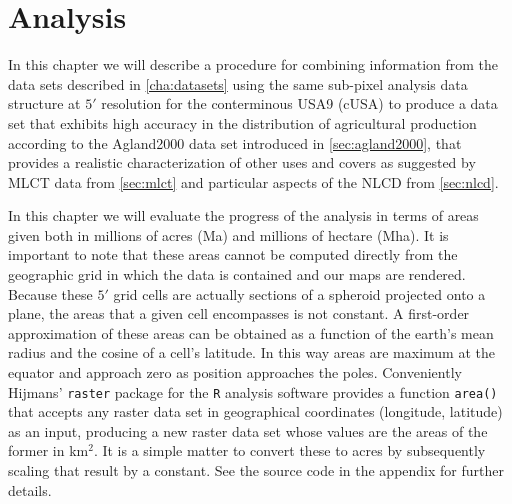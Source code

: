 










\graphicspath{ {analysis/} }

\chapter{Analysis}
\label{cha:analysis}




In this chapter we will describe a procedure for combining information
from the data sets described in \autoref{cha:datasets} using the same
sub-pixel analysis data structure at $5'$ resolution for the
conterminous USA9 (cUSA) to produce a data set that exhibits high
accuracy in the distribution of agricultural production according to
the Agland2000 data set introduced in \autoref{sec:agland2000}, that
provides a realistic characterization of other uses and covers as
suggested by MLCT data from \autoref{sec:mlct} and particular aspects
of the NLCD from \autoref{sec:nlcd}.

In this chapter we will evaluate the progress of the analysis in terms
of areas given both in millions of acres (Ma) and millions of hectare
(Mha).  It is important to note that these areas cannot be computed
directly from the geographic grid in which the data is contained and
our maps are rendered.  Because these $5'$ grid cells are actually
sections of a spheroid projected onto a plane, the areas that a given
cell encompasses is not constant.  A first-order approximation of
these areas can be obtained as a function of the earth's mean radius
and the cosine of a cell's latitude.  In this way areas are maximum at
the equator and approach zero as position approaches the poles.
Conveniently Hijmans' \texttt{raster} package for the \texttt{R}
analysis software provides a function \texttt{area()} that accepts any
raster data set in geographical coordinates (longitude, latitude) as
an input, producing a new raster data set whose values are the areas
of the former in km$^{\textrm{2}}$.  It is a simple matter to convert these to
acres by subsequently scaling that result by a constant.  See the
source code in the appendix for further details.

